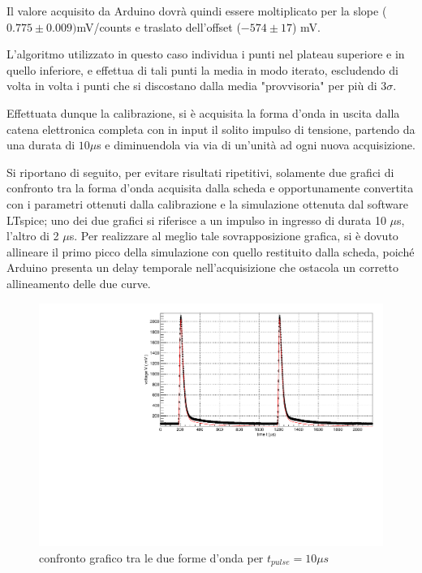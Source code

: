 \documentclass{article}
\begin{document}
Il valore acquisito da Arduino dovrà quindi essere moltiplicato per la slope ($0.775 \pm 0.009)$mV/counts
e traslato dell'offset ($-574 \pm 17$) mV.

L'algoritmo utilizzato in questo caso individua i punti nel plateau superiore e in quello 
inferiore, e effettua di tali punti la media in modo iterato, escludendo di volta in volta i punti che si discostano
dalla media "provvisoria" per più di $3\sigma$.



Effettuata dunque la calibrazione, si è acquisita la forma d'onda in uscita dalla catena elettronica completa con in input il solito
impulso di tensione, partendo da una durata di $10 \mu $s e diminuendola via via di un'unità ad ogni nuova acquisizione.

Si riportano di seguito, per evitare risultati ripetitivi, solamente due grafici di confronto tra la forma d'onda acquisita dalla scheda e opportunamente 
convertita con i parametri ottenuti dalla
calibrazione e la simulazione ottenuta dal software LTspice; uno dei due grafici si riferisce a un impulso in ingresso di durata 10 $\mu $s, l'altro di 2 $\mu $s.
Per realizzare al meglio tale sovrapposizione grafica, si è dovuto allineare il primo picco della simulazione con quello restituito dalla scheda, poiché Arduino
presenta un delay temporale nell'acquisizione che ostacola un corretto allineamento delle due curve.


\begin{center}
\begin{figure}[H]
\centering
\includegraphics[scale=0.4, angle=0]{arduino10.pdf}
\caption{confronto grafico tra le due forme d'onda per $t_{pulse}=10 \mu s$}
\label{fig:arduino10}
\end{figure}
\end{center}
\end{document}

